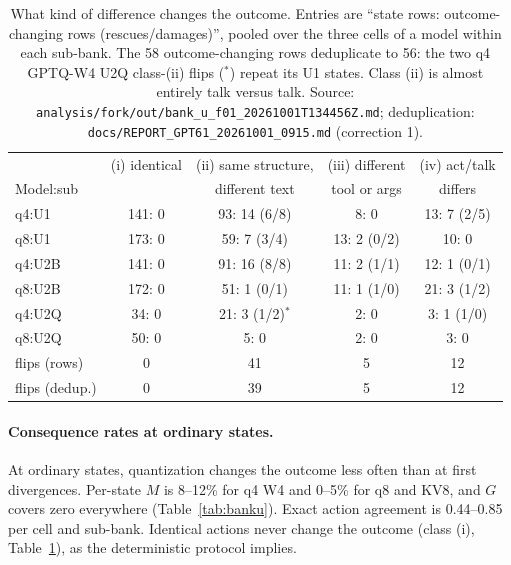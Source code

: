 \begin{table}[t]
\centering\scriptsize\setlength{\tabcolsep}{3pt}
\begin{tabular}{@{}lcccc@{}}
\toprule
& (i) identical & (ii) same structure, & (iii) different & (iv) act/talk \\
Model:sub & & different text & tool or args & differs \\
\midrule
q4:U1  & 141: 0 & 93: 14 (6/8) & 8: 0 & 13: 7 (2/5) \\
q8:U1  & 173: 0 & 59: 7 (3/4) & 13: 2 (0/2) & 10: 0 \\
q4:U2B & 141: 0 & 91: 16 (8/8) & 11: 2 (1/1) & 12: 1 (0/1) \\
q8:U2B & 172: 0 & 51: 1 (0/1) & 11: 1 (1/0) & 21: 3 (1/2) \\
q4:U2Q & 34: 0 & 21: 3 (1/2)$^\ast$ & 2: 0 & 3: 1 (1/0) \\
q8:U2Q & 50: 0 & 5: 0 & 2: 0 & 3: 0 \\
\midrule
flips (rows) & 0 & 41 & 5 & 12 \\
flips (dedup.) & 0 & 39 & 5 & 12 \\
\bottomrule
\end{tabular}
\caption{What kind of difference changes the outcome. Entries are ``state rows: outcome-changing rows (rescues/damages)'', pooled over the three cells of a model within each sub-bank. The 58 outcome-changing rows deduplicate to 56: the two q4 GPTQ-W4 U2Q class-(ii) flips ($^\ast$) repeat its U1 states. Class (ii) is almost entirely talk versus talk. Source: \nolinkurl{analysis/fork/out/bank_u_f01_20261001T134456Z.md}; deduplication: \nolinkurl{docs/REPORT_GPT61_20261001_0915.md} (correction 1).}
\label{tab:taxonomy}
\end{table}

\paragraph{Consequence rates at ordinary states.} At ordinary states, quantization changes the outcome less often than at first divergences. Per-state $M$ is 8--12\% for q4 W4 and 0--5\% for q8 and KV8, and $G$ covers zero everywhere (Table~\ref{tab:banku}). %
Exact action agreement is 0.44--0.85 per cell and sub-bank. Identical actions never change the outcome (class (i), Table~\ref{tab:taxonomy}), as the deterministic protocol implies. %

